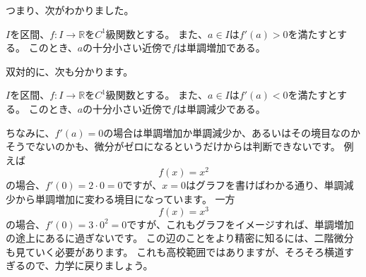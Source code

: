 つまり、次がわかりました。
\begin{theorem}\label{theorem:function-is-simply-inclease-when-differential-positive}
  $I$を区間、$f:I\to\mathbb{R}$を$C^1$級関数とする。
  また、$a\in I$は$f'(a)>0$を満たすとする。
  このとき、$a$の十分小さい近傍で$f$は単調増加である。
\end{theorem}

双対的に、次も分かります。
\begin{theorem}
  $I$を区間、$f:I\to\mathbb{R}$を$C^1$級関数とする。
  また、$a\in I$は$f'(a)<0$を満たすとする。
  このとき、$a$の十分小さい近傍で$f$は単調減少である。
\end{theorem}

ちなみに、$f'(a)=0$の場合は単調増加か単調減少か、あるいはその境目なのかそうでないのかも、微分がゼロになるというだけからは判断できないです。
例えば
\[
  f(x)=x^2
\]
の場合、$f'(0)=2\cdot0=0$ですが、$x=0$はグラフを書けばわかる通り、単調減少から単調増加に変わる境目になっています。
一方
\[
  f(x)=x^3
\]
の場合、$f'(0)=3\cdot0^2=0$ですが、これもグラフをイメージすれば、単調増加の途上にあるに過ぎないです。
この辺のことをより精密に知るには、二階微分も見ていく必要があります。
これも高校範囲ではありますが、そろそろ横道すぎるので、力学に戻りましょう。


